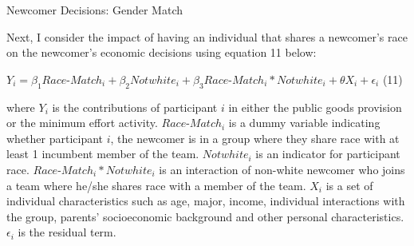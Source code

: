\begin{table}[H]
 \captionsetup{justification=raggedright,singlelinecheck=false}
\caption{Newcomer Decisions: Gender Match} \label{tab:tablea1}
    \begin{center}
        
    \end{center}
\end{table}

Next, I consider the impact of having an individual that shares a newcomer's race on the newcomer's economic decisions using equation 11 below: 

\begin{center}
 $Y_{i} = \beta_1 Race$-$Match_{i} + \beta_2 Notwhite_{i} + \beta_3 Race$-$Match_{i}*Notwhite_{i} + \theta X_{i} + \epsilon_{i}$  \space (11)
\end{center}

\noindent where $Y_{i}$ is the contributions of participant $i$ in either the public goods provision or the minimum effort activity. $Race$-$Match_{i}$ is a dummy variable indicating whether participant $i$, the newcomer is in a group where they share race with at least 1 incumbent member of the team. $Notwhite_{i}$ is an indicator for participant race. $Race$-$Match_{i}*Notwhite_{i}$ is an interaction of non-white newcomer who joins a team where he/she shares race with a member of the team. $X_{i}$ is a set of individual characteristics such as age, major, income, individual interactions with the group, parents' socioeconomic background and other personal characteristics. $\epsilon_{i}$ is the residual term. 

